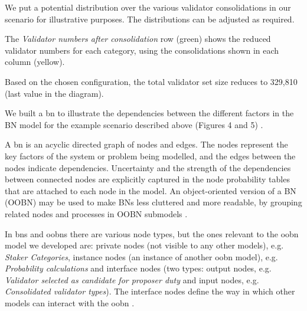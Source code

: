 \documentclass[submission,copyright,creativecommons]{eptcs}
\begin{document}
We put a potential distribution over the various validator consolidations in our scenario for illustrative purposes. The distributions can be adjusted as required.

The \emph{Validator numbers after consolidation} row (green) shows the reduced validator numbers for each category, using the consolidations shown in each column (yellow).

Based on the chosen configuration, the total validator set size reduces to 329,810 (last value in the diagram).

We built a \gls{bn} to illustrate the dependencies between the different factors in the BN model for the example scenario described above (Figures 4 and 5) \cite{Marcot2007, KjaerulffMadsen2013}.

A \gls{bn} is an acyclic directed graph of nodes and edges. The nodes represent the key factors of the system or problem being modelled, and the edges between the nodes indicate dependencies. Uncertainty and the strength of the dependencies between connected nodes are explicitly captured in the node probability tables that are attached to each node in the model. An object-oriented version of a BN (OOBN) may be used to make BNs less cluttered and more readable, by grouping related nodes and processes in OOBN submodels \cite{KollerPfeffer1997, Johnson2013}.

In \glspl{bn} and \glspl{oobn} there are various node types, but the ones relevant to the \gls{oobn} model we developed are: private nodes (not visible to any other models), e.g. \textit{Staker Categories}, instance nodes (an instance of another \gls{oobn} model), e.g. \textit{Probability calculations} and interface nodes (two types: output nodes, e.g. \textit{Validator selected as candidate for proposer duty} and input nodes, e.g. \textit{Consolidated validator types}). The interface nodes define the way in which other models can interact with the \gls{oobn} \cite{Johnson2012a}.
\end{document}
